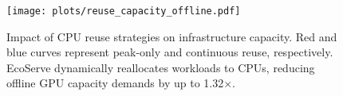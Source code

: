 \begin{figure}[t]
    \centering
    \texttt{[image: plots/reuse\_capacity\_offline.pdf]}
    \vspace{-0.2in}
    \caption{Impact of CPU reuse strategies on infrastructure capacity. Red and blue curves represent peak-only and continuous reuse, respectively. EcoServe dynamically reallocates workloads to CPUs, reducing offline GPU capacity demands by up to 1.32$\times$.}
    \label{fig:offline-result}
    \vspace{-2em}
\end{figure}

